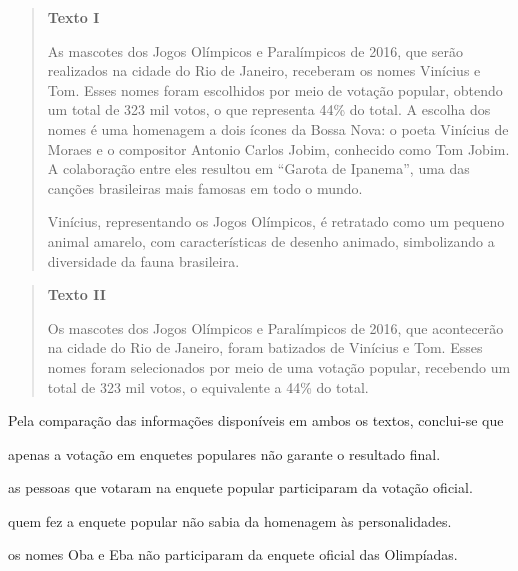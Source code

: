 \begin{quote}
\textbf{Texto I}

As mascotes dos Jogos Olímpicos e Paralímpicos de 2016, que serão
realizados na cidade do Rio de Janeiro, receberam os nomes Vinícius e
Tom. Esses nomes foram escolhidos por meio de votação popular, obtendo
um total de 323 mil votos, o que representa 44\% do total. A escolha dos
nomes é uma homenagem a dois ícones da Bossa Nova: o poeta Vinícius de
Moraes e o compositor Antonio Carlos Jobim, conhecido como Tom Jobim. A
colaboração entre eles resultou em ``Garota de Ipanema'', uma das
canções brasileiras mais famosas em todo o mundo.

Vinícius, representando os Jogos Olímpicos, é retratado como um pequeno
animal amarelo, com características de desenho animado, simbolizando a
diversidade da fauna brasileira.

\end{quote}

\begin{quote}
\textbf{Texto II}

Os mascotes dos Jogos Olímpicos e Paralímpicos de 2016, que acontecerão
na cidade do Rio de Janeiro, foram batizados de Vinícius e Tom. Esses
nomes foram selecionados por meio de uma votação popular, recebendo um
total de 323 mil votos, o equivalente a 44\% do total.

\end{quote}

Pela comparação das informações disponíveis em ambos os textos,
conclui-se que

\begin{escolha}
\item apenas a votação em enquetes populares não garante o resultado
final.

\item as pessoas que votaram na enquete popular participaram da votação
oficial.

\item quem fez a enquete popular não sabia da homenagem às personalidades.

\item os nomes Oba e Eba não participaram da enquete oficial das
Olimpíadas.
\end{escolha}


